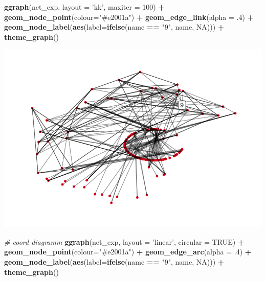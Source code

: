 \documentclass[
  12 pt,
]{article}
\newenvironment{Shaded}{\begin{snugshade}}{\end{snugshade}}
\newcommand{\CommentTok}[1]{\textcolor[rgb]{0.56,0.35,0.01}{\textit{#1}}}
\newcommand{\DataTypeTok}[1]{\textcolor[rgb]{0.13,0.29,0.53}{#1}}
\newcommand{\DecValTok}[1]{\textcolor[rgb]{0.00,0.00,0.81}{#1}}
\newcommand{\FloatTok}[1]{\textcolor[rgb]{0.00,0.00,0.81}{#1}}
\newcommand{\KeywordTok}[1]{\textcolor[rgb]{0.13,0.29,0.53}{\textbf{#1}}}
\newcommand{\NormalTok}[1]{#1}
\newcommand{\OperatorTok}[1]{\textcolor[rgb]{0.81,0.36,0.00}{\textbf{#1}}}
\newcommand{\OtherTok}[1]{\textcolor[rgb]{0.56,0.35,0.01}{#1}}
\newcommand{\StringTok}[1]{\textcolor[rgb]{0.31,0.60,0.02}{#1}}
\begin{document}
\begin{Shaded}
\begin{Highlighting}[]
\KeywordTok{ggraph}\NormalTok{(net_exp, }\DataTypeTok{layout =} \StringTok{'kk'}\NormalTok{, }\DataTypeTok{maxiter =} \DecValTok{100}\NormalTok{) }\OperatorTok{+}\StringTok{ }
\StringTok{  }\KeywordTok{geom_node_point}\NormalTok{(}\DataTypeTok{colour=}\StringTok{"#e2001a"}\NormalTok{) }\OperatorTok{+}\StringTok{ }
\StringTok{  }\KeywordTok{geom_edge_link}\NormalTok{(}\DataTypeTok{alpha =} \FloatTok{.4}\NormalTok{) }\OperatorTok{+}
\StringTok{  }\KeywordTok{geom_node_label}\NormalTok{(}\KeywordTok{aes}\NormalTok{(}\DataTypeTok{label=}\KeywordTok{ifelse}\NormalTok{(name }\OperatorTok{==}\StringTok{ "9"}\NormalTok{, name, }\OtherTok{NA}\NormalTok{))) }\OperatorTok{+}
\StringTok{  }\KeywordTok{theme_graph}\NormalTok{()}
\end{Highlighting}
\end{Shaded}

\includegraphics{Assignment_files/figure-latex/unnamed-chunk-3-1.pdf}
\newpage

\begin{Shaded}
\begin{Highlighting}[]
\CommentTok{# coord diagramm}
\KeywordTok{ggraph}\NormalTok{(net_exp, }\DataTypeTok{layout =} \StringTok{'linear'}\NormalTok{, }\DataTypeTok{circular =} \OtherTok{TRUE}\NormalTok{) }\OperatorTok{+}\StringTok{ }
\StringTok{  }\KeywordTok{geom_node_point}\NormalTok{(}\DataTypeTok{colour=}\StringTok{"#e2001a"}\NormalTok{) }\OperatorTok{+}
\StringTok{  }\KeywordTok{geom_edge_arc}\NormalTok{(}\DataTypeTok{alpha =} \FloatTok{.4}\NormalTok{) }\OperatorTok{+}
\StringTok{  }\KeywordTok{geom_node_label}\NormalTok{(}\KeywordTok{aes}\NormalTok{(}\DataTypeTok{label=}\KeywordTok{ifelse}\NormalTok{(name }\OperatorTok{==}\StringTok{ "9"}\NormalTok{, name, }\OtherTok{NA}\NormalTok{))) }\OperatorTok{+}
\StringTok{  }\KeywordTok{theme_graph}\NormalTok{()}
\end{Highlighting}
\end{Shaded}
\end{document}
